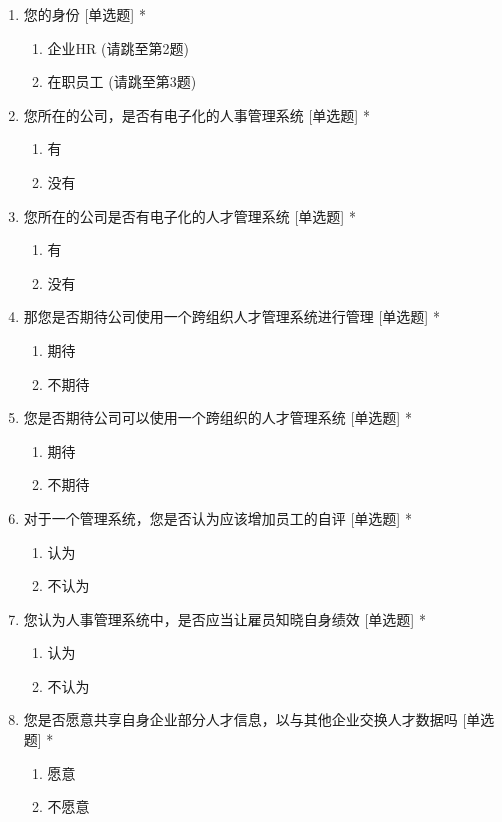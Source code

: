 \documentclass[UTF8]{ctexart}
\begin{document}
\begin{enumerate}[1.]
	\item 您的身份 [单选题] *
	\begin{enumerate}
		\item 企业HR (请跳至第2题)
		\item 在职员工 (请跳至第3题)
	\end{enumerate}
	\item 您所在的公司，是否有电子化的人事管理系统 [单选题] *
	\begin{enumerate}
		\item 有
		\item 没有
	\end{enumerate}
	\item 您所在的公司是否有电子化的人才管理系统 [单选题] *
	\begin{enumerate}
		\item 有
		\item 没有
	\end{enumerate}
	\item 那您是否期待公司使用一个跨组织人才管理系统进行管理 [单选题] *
	\begin{enumerate}
		\item 期待
		\item 不期待
	\end{enumerate}
	\item 您是否期待公司可以使用一个跨组织的人才管理系统 [单选题] *
	\begin{enumerate}
		\item 期待
		\item 不期待
	\end{enumerate}
	\item 对于一个管理系统，您是否认为应该增加员工的自评 [单选题] *
	\begin{enumerate}
		\item 认为
		\item 不认为
	\end{enumerate}
	\item 您认为人事管理系统中，是否应当让雇员知晓自身绩效 [单选题] *
	\begin{enumerate}
		\item 认为
		\item 不认为
	\end{enumerate}
	\item 您是否愿意共享自身企业部分人才信息，以与其他企业交换人才数据吗 [单选题] *
	\begin{enumerate}
		\item 愿意
		\item 不愿意

\end{enumerate}
\end{enumerate}
\end{document}
